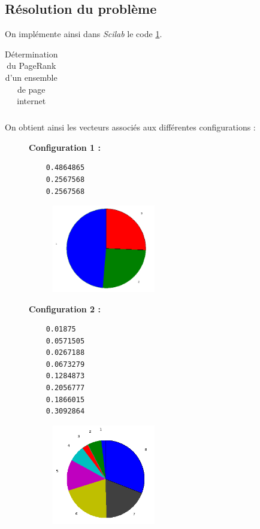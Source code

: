 \documentclass[a4paper,10pt]{report}
\begin{document}
\subsection{Résolution du problème}
On implémente ainsi dans \textit{Scilab} le code \ref{pagerank}.
\begin{table}[H]
\caption{Détermination du PageRank d'un ensemble de page internet}
\begin{tabular}{l}

\label{pagerank}
\end{tabular}
\end{table}
On obtient ainsi les vecteurs associés aux différentes configurations :\\

\begin{figure}[H]
\begin{minipage}[c]{.40\linewidth}
\textbf{Configuration 1 :}
\begin{verbatim}
    0.4864865  
    0.2567568  
    0.2567568
\end{verbatim}
\end{minipage} \hfill
\begin{minipage}[c]{.58\linewidth}
\begin{figure}[H]
   \includegraphics[width=4.5cm]{diag_config1.png}
   \end{figure}
\end{minipage}
\end{figure}

\begin{figure}[H]
\begin{minipage}[c]{.40\linewidth}
\noindent \textbf{Configuration 2 :}
\begin{verbatim}
    0.01875    
    0.0571505  
    0.0267188  
    0.0673279  
    0.1284873  
    0.2056777  
    0.1866015  
    0.3092864
\end{verbatim}
\end{minipage} \hfill
\begin{minipage}[c]{.58\linewidth}
\begin{figure}[H]
   \includegraphics[width=4.5cm]{diag_config2.png}
   \end{figure}
\end{minipage}
\end{figure}
\end{document}
